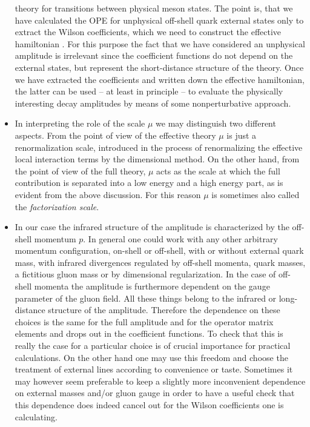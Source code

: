\begin{itemize}
theory for transitions between physical meson states. The point is,
that we have calculated the OPE for unphysical off-shell quark
external states only to extract the Wilson coefficients, which we
need to construct the effective hamiltonian . For this
purpose the fact that we have considered an unphysical amplitude is
irrelevant since the coefficient functions do not depend on the
external states, but represent the short-distance structure of the
theory. Once we have extracted the coefficients and written down
the effective hamiltonian, the latter can be used -- at least in
principle -- to evaluate the physically interesting decay amplitudes
by means of some nonperturbative approach.
\item In interpreting the role of the scale $\mu$ we may distinguish
two different aspects. From the point of view of the effective
theory $\mu$ is just a renormalization scale, introduced in the
process of renormalizing the effective local interaction terms by
the dimensional method. On the other hand, from the point of view of
the full theory, $\mu$ acts as the scale at which the full
contribution is separated into a low energy and a high energy part,
as is evident from the above discussion. For this reason $\mu$ is
sometimes also called the {\it factorization scale}.
\item In our case the infrared structure of the amplitude is
characterized by the off-shell momentum $p$.
In general one could work with any other arbitrary momentum
configuration, on-shell or off-shell, with or without external
quark mass, with infrared divergences regulated by off-shell
momenta, quark masses, a fictitious gluon mass or by dimensional
regularization. In the case of off-shell momenta the amplitude is
furthermore dependent on the gauge parameter of the gluon field.
All these things belong to the infrared or long-distance structure of
the amplitude. Therefore the dependence on these choices is the same
for the full amplitude and for the operator matrix elements and
drops out in the coefficient functions. To check that this is really
the case for a particular choice is of crucial importance for
practical calculations. On the other hand one may use this freedom and
choose the treatment of external lines according to convenience or
taste. Sometimes it may however seem preferable to keep a slightly more
inconvenient dependence on external masses and/or gluon gauge in
order to have a useful check that this dependence does indeed cancel
out for the Wilson coefficients one is calculating.
\end{itemize}

